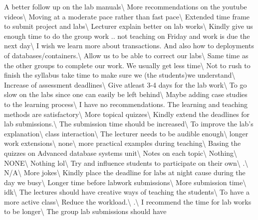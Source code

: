 \documentclass[
]{article}
\begin{document}
\hline A better follow up on the lab manuals\textbackslash{} \hline More
recommendations on the youtube videos\textbackslash{} \hline Moving at a
moderate pace rather than fast pace\textbackslash{} \hline Extended time
frame to submit project and labs\textbackslash{} \hline Lecturer explain
better on lab works\textbackslash{} \hline Kindly give us enough time to
do the group work .. not teaching on Friday and work is due the next
day\textbackslash{} \hline I wish we learn more about transactions. And
also how to deployments of databases/containers.\textbackslash{} \hline
Allow us to be able to correct our labs\textbackslash{} \hline Same time
as the other groups to complete our work. We usually get less
time\textbackslash{} \hline Not to rush to finish the syllabus take time
to make sure we (the students)we understand\textbackslash{} \hline
Increase of assessment deadlines\textbackslash{} \hline Give atleast 3-4
days for the lab work\textbackslash{} \hline To go slow on the labs
since one can easily be left behind\textbackslash{} \hline Maybe adding
case studies to the learning process\textbackslash{} \hline I have no
recommendations. The learning and teaching methods are
satisfactory\textbackslash{} \hline More topical quizzes\textbackslash{}
\hline Kindly extend the deadlines for lab submissions.\textbackslash{}
\hline The submission time should be increased\textbackslash{} \hline To
improve the lab's explanation\textbackslash{} \hline class
interaction\textbackslash{} \hline The lecturer needs to be audible
enough\textbackslash{} \hline longer work extensions\textbackslash{}
\hline none\textbackslash{} \hline more practical examples during
teaching\textbackslash{} \hline Basing the quizzes on Advanced database
systems unit\textbackslash{} \hline Notes on each topic\textbackslash{}
\hline Nothing\textbackslash{} \hline NONE\textbackslash{} \hline
Nothing lol\textbackslash{} \hline Try and influence students to
participate on their own\textbackslash{} \hline .\textbackslash{} \hline
N/A\textbackslash{} \hline More jokes\textbackslash{} \hline Kindly
place the deadline for labs at night cause during the day we
busy\textbackslash{} \hline Longer time before labwork
submissions\textbackslash{} \hline More submission time\textbackslash{}
\hline idk\textbackslash{} \hline The lectures should have creative ways
of teaching the students\textbackslash{} \hline To have a more active
class\textbackslash{} \hline Reduce the workload.\textbackslash{} \hline
.\textbackslash{} \hline I recommend the time for lab works to be
longer\textbackslash{} \hline The group lab submissions should have
\end{document}
